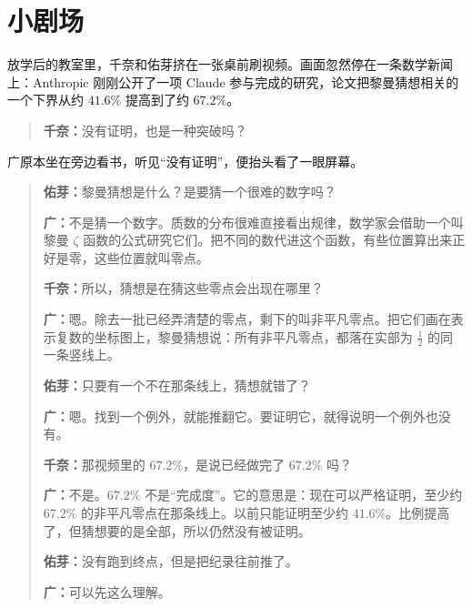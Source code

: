 


\section*{小剧场}
{}

放学后的教室里，千奈和佑芽挤在一张桌前刷视频。画面忽然停在一条数学新闻上：Anthropic 刚刚公开了一项 Claude 参与完成的研究，论文把黎曼猜想相关的一个下界从约 $41.6\%$ 提高到了约 $67.2\%$。

\begin{quote}
\textbf{千奈：}没有证明，也是一种突破吗？
\end{quote}

广原本坐在旁边看书，听见“没有证明”，便抬头看了一眼屏幕。

\begin{quote}
\textbf{佑芽：}黎曼猜想是什么？是要猜一个很难的数字吗？

\textbf{广：}不是猜一个数字。质数的分布很难直接看出规律，数学家会借助一个叫黎曼 $\zeta$ 函数的公式研究它们。把不同的数代进这个函数，有些位置算出来正好是零，这些位置就叫零点。

\textbf{千奈：}所以，猜想是在猜这些零点会出现在哪里？

\textbf{广：}嗯。除去一批已经弄清楚的零点，剩下的叫非平凡零点。把它们画在表示复数的坐标图上，黎曼猜想说：所有非平凡零点，都落在实部为 $\tfrac12$ 的同一条竖线上。

\textbf{佑芽：}只要有一个不在那条线上，猜想就错了？

\textbf{广：}嗯。找到一个例外，就能推翻它。要证明它，就得说明一个例外也没有。

\textbf{千奈：}那视频里的 $67.2\%$，是说已经做完了 $67.2\%$ 吗？

\textbf{广：}不是。$67.2\%$ 不是“完成度”。它的意思是：现在可以严格证明，至少约 $67.2\%$ 的非平凡零点在那条线上。以前只能证明至少约 $41.6\%$。比例提高了，但猜想要的是全部，所以仍然没有被证明。

\textbf{佑芽：}没有跑到终点，但是把纪录往前推了。

\textbf{广：}可以先这么理解。
\end{quote}

